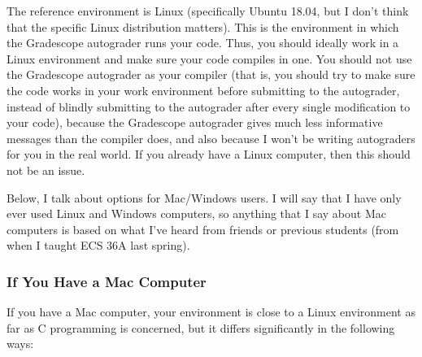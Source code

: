 \documentclass{article}
\begin{document}
The reference environment is Linux (specifically Ubuntu 18.04, but I don't think that the specific Linux distribution matters). This is the environment in which the Gradescope autograder runs your code. Thus, you should ideally work in a Linux environment and make sure your code compiles in one. You should not use the Gradescope autograder as your compiler (that is, you should try to make sure the code works in your work environment before submitting to the autograder, instead of blindly submitting to the autograder after every single modification to your code), because the Gradescope autograder gives much less informative messages than the compiler does, and also because I won't be writing autograders for you in the real world. If you already have a Linux computer, then this should not be an issue.

Below, I talk about options for Mac/Windows users. I will say that I have only ever used Linux and Windows computers, so anything that I say about Mac computers is based on what I've heard from friends or previous students (from when I taught ECS 36A last spring).

\subsubsection{If You Have a Mac Computer}

If you have a Mac computer, your environment is close to a Linux environment as far as C programming is concerned, but it differs significantly in the following ways:
\end{document}
